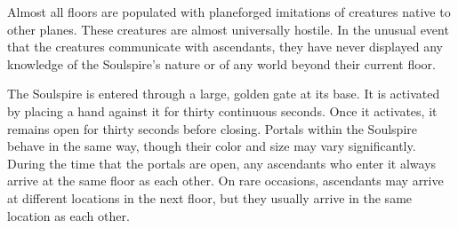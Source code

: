     Almost all floors are populated with planeforged imitations of creatures native to other planes.
    These creatures are almost universally hostile.
    In the unusual event that the creatures communicate with ascendants, they have never displayed any knowledge of the Soulspire's nature or of any world beyond their current floor.

    The Soulspire is entered through a large, golden gate at its base.
    It is activated by placing a hand against it for thirty continuous seconds.
    Once it activates, it remains open for thirty seconds before closing.
    Portals within the Soulspire behave in the same way, though their color and size may vary significantly.
    During the time that the portals are open, any ascendants who enter it always arrive at the same floor as each other.
    On rare occasions, ascendants may arrive at different locations in the next floor, but they usually arrive in the same location as each other.
